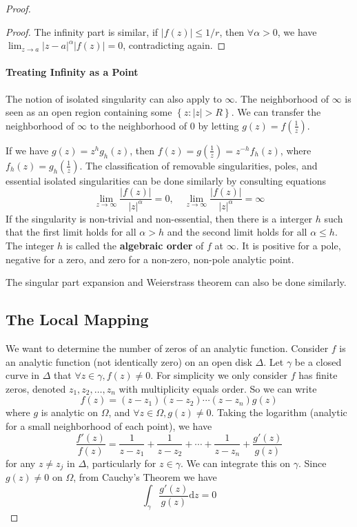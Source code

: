 \documentclass[../main.tex]{subfiles}
\begin{document}
\begin{proof}
\begin{proof}
	The infinity part is similar, if $\left|f(z)\right| \leq 1 / r$, then $\forall \alpha>0$, we have $\lim_{z \to a} \left|z-a\right|^{\alpha} \left|f(z)\right| = 0$, contradicting again.
\end{proof}

\paragraph{Treating Infinity as a Point}
The notion of isolated singularity can also apply to $\infty $. The neighborhood of $\infty $ is seen as an open region containing some $\left\{ z: \left|z\right|>R \right\}$. We can transfer the neighborhood of $\infty $ to the neighborhood of $0$ by letting $\displaystyle g(z) = f(\frac{1}{z})$.

If we have $g(z) = z^hg_h(z)$, then $f(z) = g(\frac{1}{z}) = z^{-h}f_h(z)$, where $f_h(z) = g_h(\frac{1}{z})$. The classification of removable singularities, poles, and essential isolated singularities can be done similarly by consulting equations
\begin{equation*}
\lim_{z \to \infty} \frac{\left|f(z)\right|}{\left|z\right|^{\alpha}} = 0, \quad \lim_{z \to \infty} \frac{\left|f(z)\right|}{\left|z\right|^{\alpha}} = \infty
\end{equation*}
If the singularity is non-trivial and non-essential, then there is a interger $h$ such that the first limit holds for all $\alpha>h$ and the second limit holds for all $\alpha\leq h$. The integer $h$ is called the \textbf{algebraic order} of $f$ at $\infty $. It is positive for a pole, negative for a zero, and zero for a non-zero, non-pole analytic point.

The singular part expansion and Weierstrass theorem can also be done similarly.


\subsection{The Local Mapping}
We want to determine the number of zeros of an analytic function. Consider $f$ is an analytic function (not identically zero) on an open disk  $\Delta$. Let $\gamma$ be a closed curve in $\Delta$ that $\forall z\in \gamma, f(z)\neq 0$. For simplicity we only consider $f$ has finite zeros, denoted $z_1,z_2, \ldots ,z_n$ with multiplicity equals order. So we can write
\begin{equation}
	f(z) = (z-z_1)(z-z_2)\cdots (z-z_n)g(z)
\end{equation}
where $g$ is analytic on $\Omega$, and $\forall z\in \Omega, g(z)\neq 0$. Taking the logarithm (analytic for a small neighborhood of each point), we have
\begin{equation}
	\frac{f'(z)}{f(z)} = \frac{1}{z-z_1} + \frac{1}{z-z_2} + \cdots + \frac{1}{z-z_n} + \frac{g'(z)}{g(z)}
\end{equation}
for any $z\neq z_j$ in $\Delta$, particularly for $z\in \gamma$. We can integrate this on $\gamma$. Since $g(z)\neq 0$ on $\Omega$, from Cauchy's Theorem we have
\begin{equation*}
\int_{\gamma} \frac{g'(z)}{g(z)} \mathrm{d} z = 0
\end{equation*}


\end{proof}
\end{document}
